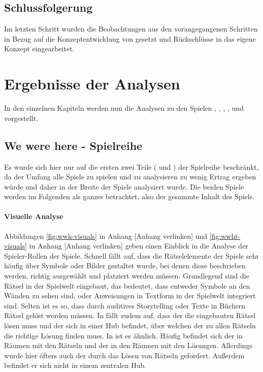 \subsection{Schlussfolgerung}
Im letzten Schritt wurden die Beobachtungen aus den vorangegangenen Schritten in Bezug auf die Konzeptentwicklung von  gesetzt und Rückschlüsse in das eigene Konzept eingearbeitet.

\section{Ergebnisse der Analysen}
In den einzelnen Kapiteln werden nun die Analysen zu den Spielen , , , ,  und  vorgestellt.

\subsection{We were here - Spielreihe}
Es wurde sich hier nur auf die ersten zwei Teile ( und ) der Spielreihe beschränkt, da der Umfang alle Spiele zu spielen und zu analysieren zu wenig Ertrag ergeben würde und daher in der Breite der Spiele analysiert wurde. Die beiden Spiele werden im Folgenden als ganzes betrachtet, also der gesammte Inhalt des Spiels.

\paragraph{Visuelle Analyse}
Abbildungen \ref{fig:wwh-visuals} in Anhang [Anhang verlinken] und \ref{fig:wwht-visuals} in Anhang [Anhang verlinken] geben einen Einblick in die Analyse der Spieler-Rollen der Spiele. Schnell fällt auf, dass die Rätselelemente der Spiele sehr häufig über Symbole oder Bilder gestaltet wurde, bei denen diese beschrieben werden, richtig ausgewählt und platziert werden müssen. Grundlegend sind die Rätsel in der Spielwelt eingebaut, das bedeutet, dass entweder Symbole an den Wänden zu sehen sind, oder Anweisungen in Textform in der Spielwelt integriert sind. Selten ist es so, dass durch auditives Storytelling oder Texte in Büchern Rätsel gelöst werden müssen. In  fällt zudem auf, dass der  die eingebauten Rätsel lösen muss und der  sich in einer Hub befindet, über welchen der zu allen Rätseln die richtige Lösung finden muss. In  ist es ähnlich. Häufig befindet sich der  in Räumen mit den Rätseln und der  in den Räumen mit den Lösungen. Allerdings wurde hier öfters auch der  durch das Lösen von Rätseln gefordert. Außerdem befindet er sich nicht in einem zentralen Hub.

